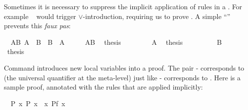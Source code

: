 \begin{isabellebody}
\begin{isamarkuptext}
Sometimes it is necessary to suppress the implicit application of rules in a
. For example ~ would
trigger $\lor$-introduction, requiring us to prove . A simple
``\isa{{\isacharminus}}'' prevents this \emph{faux pas}:%
\end{isamarkuptext}%
\isamarkuptrue%
\isamarkupfalse%
\ \ AB{\isacharcolon}\ {\isachardoublequoteopen}A\ {\isasymor}\ B{\isachardoublequoteclose}\ \ {\isachardoublequoteopen}B\ {\isasymor}\ A{\isachardoublequoteclose}\isanewline
%
\isadelimproof
%
\endisadelimproof
%
\isatagproof
{}\isamarkupfalse%
\ {\isacharminus}\isanewline
\ \ \isamarkupfalse%
\ AB\ \isamarkupfalse%
\ {\isacharquery}thesis\isanewline
\ \ \isamarkupfalse%
\isanewline
\ \ \ \ \isamarkupfalse%
\ A\ \isamarkupfalse%
\ {\isacharquery}thesis\ \isacommand{{\isachardot}{\isachardot}}\isamarkupfalse%
\isanewline
\ \ \isamarkupfalse%
\isanewline
\ \ \ \ \isamarkupfalse%
\ B\ \isamarkupfalse%
\ {\isacharquery}thesis\ \isacommand{{\isachardot}{\isachardot}}\isamarkupfalse%
\isanewline
\ \ \isamarkupfalse%
\isanewline
{}\isamarkupfalse%
%
\endisatagproof
{\isafoldproof}%
%
\isadelimproof
%
\endisadelimproof
%
\isamarkuptrue%
%
\begin{isamarkuptext}%
Command  introduces new local variables into a
proof. The pair - corresponds to \isa{{\isasymAnd}}
(the universal quantifier at the
meta-level) just like - corresponds to
\isa{{\isasymLongrightarrow}}. Here is a sample proof, annotated with the rules that are
applied implicitly:%
\end{isamarkuptext}%
\isamarkuptrue%
\isamarkupfalse%
\ \ P{\isacharcolon}\ {\isachardoublequoteopen}{\isasymforall}x{\isachardot}\ P\ x{\isachardoublequoteclose}\ \ {\isachardoublequoteopen}{\isasymforall}x{\isachardot}\ P{\isacharparenleft}f\ x{\isacharparenright}{\isachardoublequoteclose}\isanewline
%
\isadelimproof
%
\endisadelimproof
%
\isatagproof
{}\isamarkupfalse%
\ \ \ \ \ \ \ \ \ \ \ \ \ \ \ \ \ \ \ \ \ \ \ %
\end{isabellebody}
